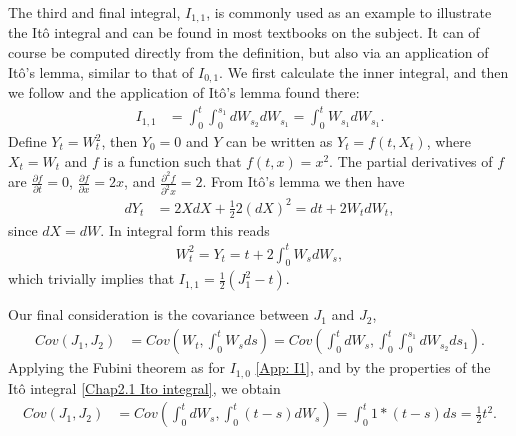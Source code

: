 The third and final integral, $I_{1,1}$, is commonly used as an example to illustrate the Itô integral and can be found in most textbooks on the subject.
It can of course be computed directly from the definition, but also via an application of Itô's lemma, similar to that of $I_{0,1}$.
We first calculate the inner integral, and then we follow \cite{bjork2009arbitrage} and the application of Itô's lemma found there:
\begin{align}
I_{1,1}&=\int_0^t \int_0^{s_1} dW_{s_2}dW_{s_1}= \int_0^t W_{s_1}dW_{s_1}.
\end{align}
Define $Y_t=W_t^2$, then $Y_0=0$ and $Y$ can be written as $Y_t=f(t,X_t)$, where $X_t=W_t$ and $f$ is a function such that $f(t,x)=x^2$.
The partial derivatives of $f$ are $\frac{\partial f}{\partial t}=0$, $\frac{\partial f}{\partial x}=2x$, and $\frac{\partial^2 f}{\partial^2 x}=2$.
From Itô's lemma we then have
\begin{align}
dY_t&=2XdX + \frac{1}{2}2(dX)^2=dt + 2W_tdW_t,
\end{align}
since $dX=dW$.
In integral form this reads
\begin{align}
W_t^2=Y_t=t + 2\int_0^t W_sdW_s,
\end{align}
which trivially implies that $I_{1,1}=\frac{1}{2}\left( J_1^2 - t \right)$.

Our final consideration is the covariance between $J_1$ and $J_2$,
\begin{align}
Cov(J_1,J_2)&=Cov\left( W_t, \int_0^t W_s ds \right)=Cov\left( \int_0^tdW_s,\int_0^t \int_0^{s_1} dW_{s_2}ds_1  \right).
\end{align}
Applying the Fubini theorem as for $I_{1,0}$ \eqref{App: I1}, and by the properties of the Itô integral \eqref{Chap2.1 Ito integral}, we obtain
\begin{align}
Cov(J_1,J_2)&=Cov\left( \int_0^tdW_s,\int_0^t (t-s)dW_s  \right)=\int_0^t 1*(t-s)ds=\frac{1}{2}t^2.
\end{align}